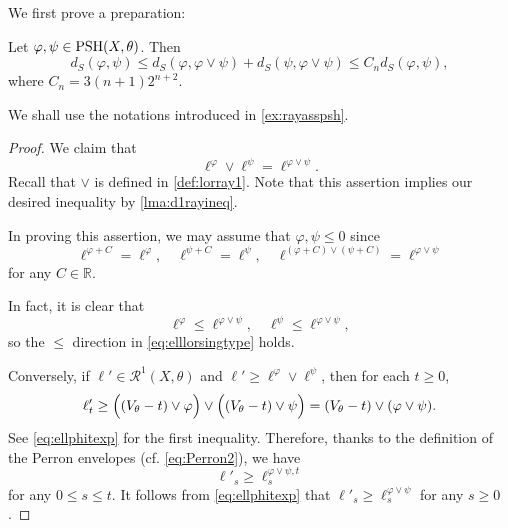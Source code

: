 We first prove a preparation:
\begin{lemma}\label{lma:dSalmostriang}
    Let $\varphi,\psi\in \mathrm{PSH}(X,\theta)$. Then
    \[
        d_S(\varphi,\psi)\leq d_S(\varphi,\varphi\lor \psi)+d_S(\psi,\varphi\lor \psi) \leq C_n d_S(\varphi,\psi),
    \]
    where $C_n=3(n+1)2^{n+2}$.
\end{lemma}
We shall use the notations introduced in \cref{ex:rayasspsh}.
\begin{proof}
    We claim that
    \begin{equation}\label{eq:elllorsingtype}
        \ell^{\varphi}\lor \ell^{\psi}=\ell^{\varphi\lor \psi}.
    \end{equation}
    Recall that $\lor$ is defined in \cref{def:lorray1}.
    Note that this assertion implies our desired inequality by \cref{lma:d1rayineq}.

    In proving this assertion, we may assume that $\varphi,\psi\leq 0$ since
    \[
    \ell^{\varphi+C}=\ell^{\varphi},\quad \ell^{\psi+C}=\ell^{\psi},\quad \ell^{(\varphi+C)\lor (\psi+C)}=\ell^{\varphi\lor \psi}
    \]
    for any $C\in \mathbb{R}$.

    In fact, it is clear that
    \[
        \ell^{\varphi}\leq   \ell^{\varphi\lor \psi},\quad \ell^{\psi}\leq   \ell^{\varphi\lor \psi},
    \]
    so the $\leq$ direction in \eqref{eq:elllorsingtype} holds.

    Conversely, if $\ell'\in \mathcal{R}^1(X,\theta)$ and $\ell'\geq \ell^{\varphi}\lor \ell^{\psi}$, then for each $t\geq 0$,
    \[
        \ell'_t\geq \Bigl((V_{\theta}-t)\lor \varphi\Bigr) \lor \Bigl((V_{\theta}-t)\lor \psi\Bigr)=(V_{\theta}-t)\lor (\varphi\lor \psi).
    \]
    See \eqref{eq:ellphitexp} for the first inequality.
    Therefore, thanks to the definition of the Perron envelopes (cf. \eqref{eq:Perron2}), we have
    \[
    \ell'_s\geq \ell^{\varphi\lor \psi,t}_s
    \]
    for any $0\leq s\leq t$.
    It follows from \eqref{eq:ellphitexp} that $\ell'_s\geq \ell^{\varphi\lor \psi}_s$ for any $s\geq 0$.
\end{proof}


